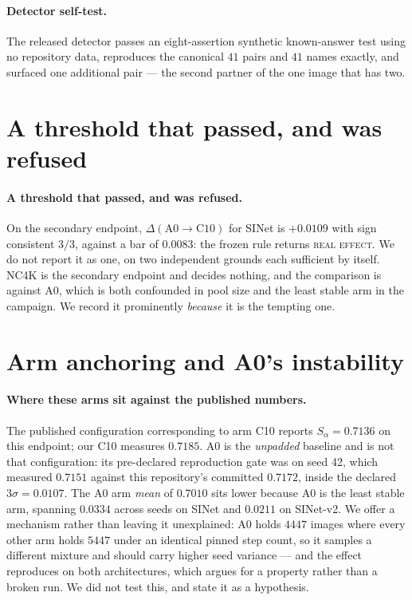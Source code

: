 \documentclass{article} %
\begin{document}
\paragraph{Detector self-test.} The released detector passes an eight-assertion synthetic
known-answer test using no repository data, reproduces the canonical $41$ pairs and $41$ names
exactly, and surfaced one additional pair --- the second partner of the one image that has two.


\section{A threshold that passed, and was refused}

\paragraph{A threshold that passed, and was refused.} On the secondary endpoint,
$\Delta(\mathrm{A0} \rightarrow \mathrm{C10})$ for SINet is $+0.0109$ with sign consistent $3/3$,
against a bar of $0.0083$: the frozen rule returns \textsc{real effect}. We do not report it as
one, on two independent grounds each sufficient by itself. NC4K is the secondary endpoint and decides
nothing, and the comparison is against A0, which is both confounded in pool size and the least
stable arm in the campaign. We record it prominently \emph{because} it is the tempting one.


\section{Arm anchoring and A0's instability}
\label{app:anchor}

\paragraph{Where these arms sit against the published numbers.} The published configuration
corresponding to arm C10 reports $S_\alpha = 0.7136$ on this endpoint; our C10 measures $0.7185$. A0
is the \emph{unpadded} baseline and is not that configuration: its pre-declared reproduction gate was
on seed 42, which measured $0.7151$ against this repository's committed $0.7172$, inside the declared
$3\sigma = 0.0107$. The A0 arm \emph{mean} of $0.7010$ sits lower because A0 is the least stable arm,
spanning $0.0334$ across seeds on SINet and $0.0211$ on SINet-v2. We offer a mechanism rather than
leaving it unexplained: A0 holds $4447$ images where every other arm holds $5447$ under an identical
pinned step count, so it samples a different mixture and should carry higher seed variance --- and the
effect reproduces on both architectures, which argues for a property rather than a broken run. We did
not test this, and state it as a hypothesis.
\end{document}
